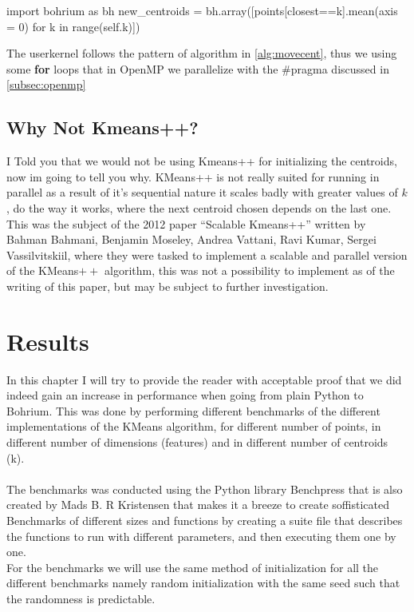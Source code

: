 \documentclass[12pt]{report}
\begin{document}
\begin{python}[caption={Naive implementation of reassigning the centroids using for loop }\label{code:reasign_naive}]
  import bohrium as bh
  new_centroids = bh.array([points[closest==k].mean(axis = 0)
                                    for k in range(self.k)])
\end{python}

The userkernel follows the pattern of algorithm in \ref{alg:movecent}, thus we using some \textbf{for} loops that in OpenMP we parallelize with the \#pragma discussed in \ref{subsec:openmp}

\section{Why  Not Kmeans++?}
\label{sec:notplusplus}
I Told you that we would not be using Kmeans++ for initializing the centroids, now im going to tell you why. KMeans++ is not really suited for running in parallel as a result of it's sequential nature it scales badly with greater values of $k$, do the way it works, where the next centroid chosen depends on the last one. This was the subject of the 2012 paper ``Scalable Kmeans++'' \cite{scalableKmeans} written by Bahman Bahmani, Benjamin Moseley, Andrea Vattani, Ravi Kumar, Sergei Vassilvitskiil, where they were tasked to implement a scalable and parallel version of the KMeans$++$ algorithm, this was not a possibility to implement as of the writing of this paper, but may be subject to further investigation.




\chapter{Results}
\label{sec:label}
In this chapter I will try to provide the reader with acceptable proof that we did indeed gain an increase in performance when going from plain Python to Bohrium. This was done by performing different benchmarks of the different implementations of the KMeans algorithm, for different number of points, in different number of dimensions (features) and in different number of centroids (k).\\\\ The benchmarks was conducted using the Python library Benchpress that is also created by Mads B. R Kristensen that makes it a breeze to create soffisticated Benchmarks of different sizes and functions by creating a suite file that describes the functions to run with different parameters, and then executing them one by one.\\
For the benchmarks we will use the same method of initialization for all the different benchmarks namely random initialization with the same seed such that the randomness is predictable.
\end{document}
